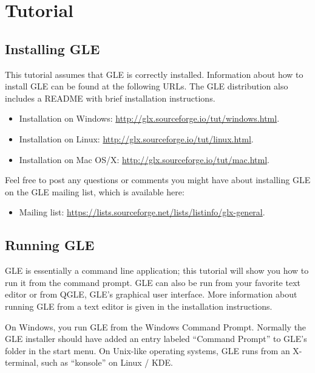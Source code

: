 \def\tb{\hspace*{0.0cm}\sf}
\chapter{Tutorial}
\label{tut:chap}

\section{Installing GLE}

This tutorial assumes that GLE is correctly installed. Information about how to install GLE can be found at the following URLs. The GLE distribution also includes a README with brief installation instructions.

\begin{itemize}
\item Installation on Windows: \url{http://glx.sourceforge.io/tut/windows.html}.

\item Installation on Linux: \url{http://glx.sourceforge.io/tut/linux.html}.

\item Installation on Mac OS/X: \url{http://glx.sourceforge.io/tut/mac.html}.
\end{itemize}

Feel free to post any questions or comments you might have about installing GLE on the GLE mailing list, which is available here:

\begin{itemize}
\item Mailing list: \url{https://lists.sourceforge.net/lists/listinfo/glx-general}.
\end{itemize}

\section{Running GLE}

GLE is essentially a command line application; this tutorial will show you how to run it from the command prompt. GLE can also be run from your favorite text editor or from QGLE, GLE's graphical user interface. More information about running GLE from a text editor is given in the installation instructions.

On Windows, you run GLE from the Windows Command Prompt. Normally the GLE installer should have added an entry labeled ``Command Prompt'' to GLE's folder in the start menu. On Unix-like operating systems, GLE runs from an X-terminal, such as ``konsole'' on Linux / KDE.

